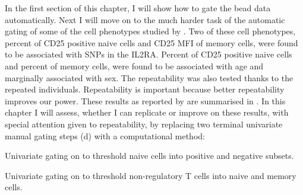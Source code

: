 In the first section of this chapter, I will show how to gate the bead data automatically.
Next I will move on to the much harder task of the automatic gating of some of the cell phenotypes studied by \citet{Dendrou:2009dv}.
Two of these cell phenotypes, percent of CD25 positive naive cells and CD25 MFI of memory cells, were found to be associated with SNPs in the IL2RA.
Percent of CD25 positive naive cells and percent of memory cells, were found to be associated with age and marginally associated with sex.
The repeatability was also tested thanks to the repeated individuals.
Repeatability is important because better repeatability improves our power.
These results as reported by \citet{Dendrou:2009dv} are summarised in .  
In this chapter I will assess, whether I can replicate or improve on these results, with special attention given to repeatability,
by replacing two terminal univariate manual gating steps (d)
with a computational method:
\begin{itemise}
\item Univariate gating on  to threshold naive cells into positive and negative subsets.
\item Univariate gating on  to threshold non-regulatory T cells into naive and memory cells.
\end{itemise}

